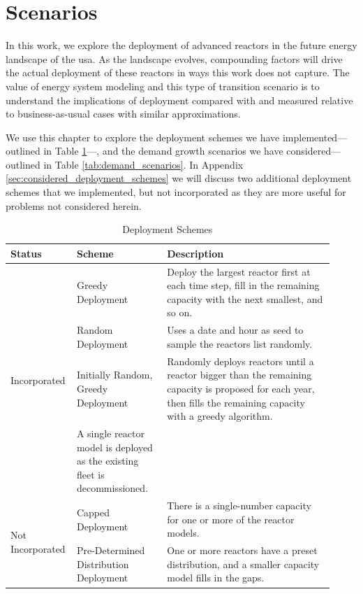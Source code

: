 \section{Scenarios}
\label{sec:scenarios}

In this work, we explore the deployment of advanced reactors in the future
energy landscape of the \gls{usa}. As the landscape evolves, compounding
factors will drive the actual deployment of these reactors in ways this work
does not capture. The value of energy system modeling and this type of
transition scenario is to understand the implications of deployment compared
with and measured relative to business-as-usual cases with similar
approximations.

We use this chapter to explore the deployment schemes we have
implemented---outlined in Table \ref{tab:deployment_schemes}---, and the demand
growth scenarios we have considered---outlined in Table
\ref{tab:demand_scenarios}. In Appendix \ref{sec:considered_deployment_schemes}
we will discuss two additional deployment schemes that we implemented, but
not incorporated as they are more useful for problems not considered herein.

\begin{table}[H]
    \centering
    \caption{Deployment Schemes}
    \label{tab:deployment_schemes}
    \begin{tabular}{p{0.15\linewidth} p{0.27\linewidth} p{0.50\linewidth}}
        \hline
        \textbf{Status} & \textbf{Scheme} & \textbf{Description} \\
        \hline
        \multirow{4}{*}{Incorporated} & Greedy Deployment & Deploy the largest
        reactor first at each time step, fill in the remaining capacity with
        the next smallest, and so on. \\
        & Random Deployment & Uses a date and hour as seed to sample the
        reactors list randomly. \\
        & Initially Random, Greedy Deployment & Randomly deploys reactors until
        a reactor bigger than the remaining capacity is proposed for each year,
        then fills the remaining capacity with a greedy algorithm. \\
        Single Reactor & A single reactor model is deployed as the existing fleet is decommissioned.\\
        \hline
        \multirow{2}{*}{Not Incorporated} & Capped Deployment & There is a
        single-number capacity for one or more of the reactor models. \\
        & Pre-Determined Distribution Deployment & One or more reactors have a
        preset distribution, and a smaller capacity model fills in the gaps. \\
        \hline
    \end{tabular}
\end{table}

